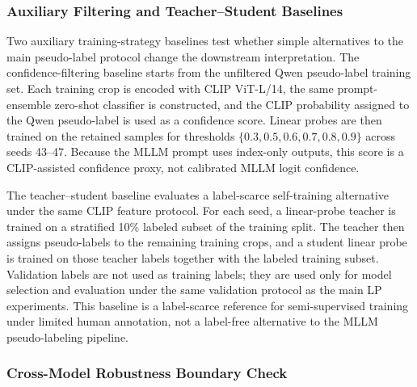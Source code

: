 \documentclass{ieeeaccess}
\begin{document}
\subsubsection{Auxiliary Filtering and Teacher--Student Baselines}

Two auxiliary training-strategy baselines test whether simple
alternatives to the main pseudo-label protocol change the downstream
interpretation. The confidence-filtering baseline starts from the
unfiltered Qwen pseudo-label training set. Each training crop is encoded
with CLIP ViT-L/14, the same prompt-ensemble zero-shot classifier is
constructed, and the CLIP probability assigned to the Qwen pseudo-label
is used as a confidence score. Linear probes are then trained on the
retained samples for thresholds $\{0.3,0.5,0.6,0.7,0.8,0.9\}$ across
seeds 43--47. Because the MLLM prompt uses index-only outputs, this
score is a CLIP-assisted confidence proxy, not calibrated MLLM logit
confidence.

The teacher--student baseline evaluates a label-scarce self-training
alternative under the same CLIP feature protocol. For each seed, a
linear-probe teacher is trained on a stratified 10\% labeled subset of
the training split. The teacher then assigns pseudo-labels to the
remaining training crops, and a student linear probe is trained on those
teacher labels together with the labeled training subset. Validation
labels are not used as training labels; they are used only for model
selection and evaluation under the same validation protocol as the main
LP experiments. This baseline is a label-scarce reference for
semi-supervised training under limited human annotation, not a label-free
alternative to the MLLM pseudo-labeling pipeline.

\subsubsection{Cross-Model Robustness Boundary Check}
\end{document}

